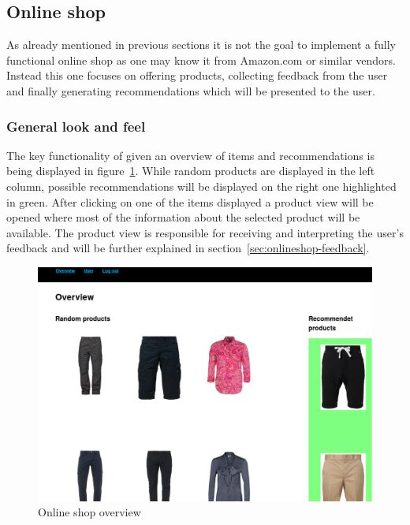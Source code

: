 
\subsection{Online shop}
\label{sec:online-shop}
As already mentioned in previous sections it is not the goal to implement a fully functional online shop as one may know it from Amazon.com or similar vendors.
Instead this one focuses on offering products, collecting feedback from the user and finally generating recommendations which will be presented to the user.

\subsubsection{General look and feel}
The key functionality of given an overview of items and recommendations is being displayed in figure~\ref{fig:onlineshop-overview}.
While random products are displayed in the left column, possible recommendations will be displayed on the right one highlighted in green.
After clicking on one of the items displayed a product view will be opened where most of the information about the selected product will be available.
The product view is responsible for receiving and interpreting the user's feedback and will be further explained in section~\ref{sec:onlineshop-feedback}.

\begin{figure}[h]
    \center
    \includegraphics[scale=0.3]{inc/implementation/onlineshop/recommender_onlineshop_overview}
    \caption{Online shop overview}
    \label{fig:onlineshop-overview}
\end{figure}

